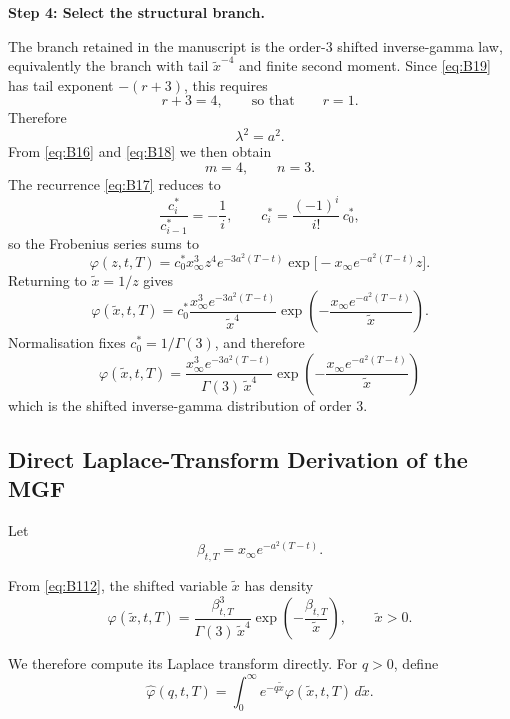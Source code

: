 \documentclass[12pt]{article}
\theoremstyle{statementstyle}
\begin{document}
\begin{appendices}
\medskip
\noindent\textbf{Step 4: Select the structural branch.}

The branch retained in the manuscript is the order-3 shifted
inverse-gamma law, equivalently the branch with tail
\(\widetilde{x}^{-4}\) and finite second moment. Since \eqref{eq:B19} has tail exponent \(-(r+3)\), this requires
\[
r+3=4,
\qquad\text{so that}\qquad
r=1.
\]
Therefore
\begin{equation}
\boxed{\lambda^{2}=a^{2}}.
\tag{B.1.10}\label{eq:B110}
\end{equation}
From \eqref{eq:B16} and \eqref{eq:B18} we then obtain
\[
m=4,
\qquad
n=3.
\]
The recurrence \eqref{eq:B17} reduces to
\[
\frac{c_i^{*}}{c_{i-1}^{*}}=-\frac{1}{i},
\qquad
c_i^{*}=\frac{(-1)^i}{i!}\,c_0^{*},
\]
so the Frobenius series sums to
\[
\varphi(z,t,T)
=
c_0^{*}x_{\infty}^{3}z^{4}e^{-3a^{2}(T-t)}
\exp\!\bigl[-x_{\infty}e^{-a^{2}(T-t)}z\bigr].
\]
Returning to \(\widetilde{x}=1/z\) gives
\begin{equation}
\varphi(\widetilde{x},t,T)
=
c_0^{*}
\frac{x_{\infty}^{3}e^{-3a^{2}(T-t)}}{\widetilde{x}^{4}}
\exp\!\left(
-\frac{x_{\infty}e^{-a^{2}(T-t)}}{\widetilde{x}}
\right).
\tag{B.1.11}\label{eq:B111}
\end{equation}
Normalisation fixes \(c_0^{*}=1/\Gamma(3)\), and therefore
\begin{equation}
\boxed{
\varphi(\widetilde{x},t,T)
=
\frac{x_{\infty}^{3}e^{-3a^{2}(T-t)}}{\Gamma(3)\,\widetilde{x}^{4}}
\exp\!\left(
-\frac{x_{\infty}e^{-a^{2}(T-t)}}{\widetilde{x}}
\right)
}
\tag{B.1.12}\label{eq:B112}
\end{equation}
which is the shifted inverse-gamma distribution of order \(3\).

\subsection{Direct Laplace-Transform Derivation of the MGF}
\label{appendix:B2}

Let
\[
\beta_{t,T}
=
x_{\infty}e^{-a^{2}(T-t)}.
\]

From \eqref{eq:B112}, the shifted variable \(\widetilde{x}\) has density
\[
\varphi(\widetilde{x},t,T)
=
\frac{\beta_{t,T}^{3}}{\Gamma(3)\,\widetilde{x}^{4}}
\exp\!\left(
-\frac{\beta_{t,T}}{\widetilde{x}}
\right),
\qquad
\widetilde{x}>0.
\]

We therefore compute its Laplace transform directly. For \(q>0\), define
\[
\widehat{\varphi}(q,t,T)
=
\int_{0}^{\infty} e^{-q\widetilde{x}}\varphi(\widetilde{x},t,T)\,d\widetilde{x}.
\]


\end{appendices}
\end{document}
